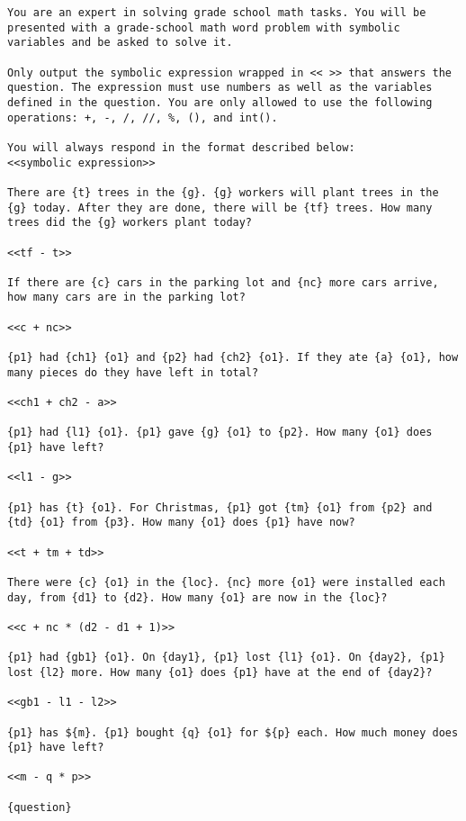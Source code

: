 \begin{lstlisting}[style=myGrammarStyle, caption= Prompt Template For GSM-Symbolic Evaluation Without CoT]
You are an expert in solving grade school math tasks. You will be presented with a grade-school math word problem with symbolic variables and be asked to solve it.

Only output the symbolic expression wrapped in << >> that answers the question. The expression must use numbers as well as the variables defined in the question. You are only allowed to use the following operations: +, -, /, //, %, (), and int().

You will always respond in the format described below: 
<<symbolic expression>>

There are {t} trees in the {g}. {g} workers will plant trees in the {g} today. After they are done, there will be {tf} trees. How many trees did the {g} workers plant today?

<<tf - t>>

If there are {c} cars in the parking lot and {nc} more cars arrive, how many cars are in the parking lot?

<<c + nc>>

{p1} had {ch1} {o1} and {p2} had {ch2} {o1}. If they ate {a} {o1}, how many pieces do they have left in total?

<<ch1 + ch2 - a>>

{p1} had {l1} {o1}. {p1} gave {g} {o1} to {p2}. How many {o1} does {p1} have left?

<<l1 - g>>

{p1} has {t} {o1}. For Christmas, {p1} got {tm} {o1} from {p2} and {td} {o1} from {p3}. How many {o1} does {p1} have now?

<<t + tm + td>>

There were {c} {o1} in the {loc}. {nc} more {o1} were installed each day, from {d1} to {d2}. How many {o1} are now in the {loc}?

<<c + nc * (d2 - d1 + 1)>>

{p1} had {gb1} {o1}. On {day1}, {p1} lost {l1} {o1}. On {day2}, {p1} lost {l2} more. How many {o1} does {p1} have at the end of {day2}?

<<gb1 - l1 - l2>>

{p1} has ${m}. {p1} bought {q} {o1} for ${p} each. How much money does {p1} have left?

<<m - q * p>>

{question}
\end{lstlisting}
\label{gram:gsm_prompt_no_cot}